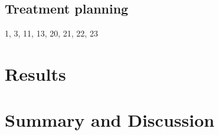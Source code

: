 \documentclass[type=dr, dr=rernat, accentcolor=tud7b,colorbacktitle, bigchapter, openright, twoside, 12pt ]{tudthesis}
\begin{document}
\subsection{Treatment planning}











1, 3, 11, 13, 20, 21, 22, 23

\section{Results}

\section{Summary and Discussion}






{}
% 
\end{document}
